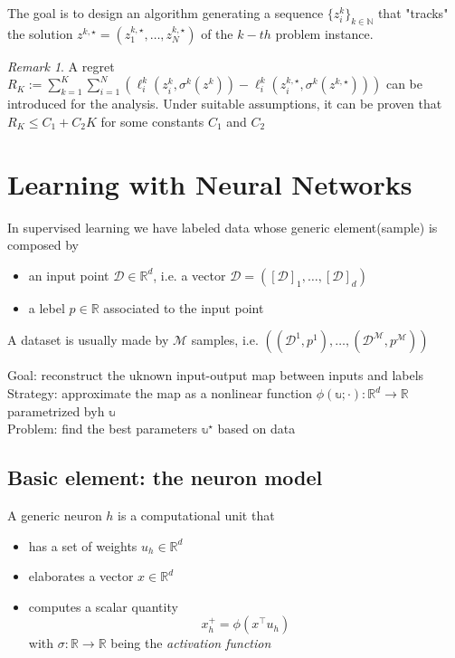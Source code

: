 \documentclass{book}
\newcommand{\R}{\mathbb{R}}
\newcommand{\N}{\mathbb{N}}
\theoremstyle{theoremv2}
\theoremstyle{defv2}
\theoremstyle{remark}
\newtheorem*{remark}{Remark}
\theoremstyle{remark}
\theoremstyle{definition}
\theoremstyle{definition}
\begin{document}
The goal is to design an algorithm generating a sequence $\{z_i^k\}_{k\in\N}$ that "tracks" the solution $z^{k,\star}=(z_1^{k,\star},\dots,z_N^{k,\star})$ of the $k-th$ problem instance.

\begin{remark}
    A regret $R_K := \sum_{k=1}^{K}\sum_{i=1}^{N}\left(\ell_i^k(z_i^k,\sigma^k(z^k))-\ell_i^k(z_i^{k,\star},\sigma^k(z^{k,\star}))\right)$ can be introduced for the analysis. Under suitable assumptions, it can be proven that $R_K\leq C_1 + C_2K$ for some constants $C_1$ and $C_2$
\end{remark}


\chapter{Learning with Neural Networks}
In supervised learning we have labeled data whose generic element(sample) is composed by 
\begin{itemize}
    \item an input point $\mathcal{D}\in\R^d$, i.e. a vector $\mathcal{D} = ([\mathcal{D}]_1,\dots,[\mathcal{D}]_d)$ 
        \item a lebel $p\in\R$ associated to the input point
\end{itemize}
A dataset is usually made by $\mathcal{M}$ samples, i.e. $((\mathcal{D}^1,p^1),\dots,(\mathcal{D}^\mathcal{M},p^\mathcal{M}))$

Goal: reconstruct the uknown input-output map between inputs and labels\\
Strategy: approximate the map as a nonlinear function $\phi(\mathbb{u};\cdot):\R^d\to\R$ parametrized byh $\mathbb{u}$\\
Problem: find the best parameters $\mathbb{u}^\star$ based on data

\section{Basic element: the neuron model}
A generic neuron $h$ is a computational unit that 
\begin{itemize}
    \item has a set of weights $u_h\in\R^d$ 
    \item elaborates a vector $x\in\R^d$
    \item computes a scalar quantity 
        \[
            x_h^+ = \phi(x^\top u_h)
        \]
        with $\sigma:\R\to\R$ being the \emph{activation function}
\end{itemize}
\end{document}
